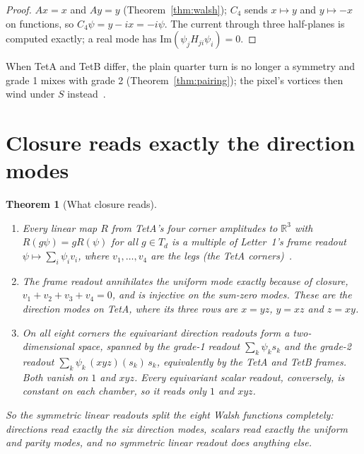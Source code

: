 \documentclass[twocolumn]{iopjournal}
\newtheorem{theorem}{Theorem}
\theoremstyle{definition}
\theoremstyle{remark}
\begin{document}
\begin{proof}
$Ax = x$ and $Ay = y$ (Theorem~\ref{thm:walsh}); $C_4$ sends $x \mapsto y$
and $y \mapsto -x$ on functions, so $C_4\psi = y - ix = -i\psi$. The
current through three half-planes is computed exactly; a real mode has
$\mathrm{Im}(\psi_jH_{ji}\psi_i) = 0$.
\end{proof}

When TetA and TetB differ, the plain quarter turn is no longer a
symmetry and grade 1 mixes with grade 2 (Theorem~\ref{thm:pairing}); the
pixel's vortices then wind under $S$ instead~\cite{NelsonVortex}.


\section{Closure reads exactly the direction modes}

\begin{theorem}[What closure reads]
\label{thm:closure}
\begin{enumerate}
\item[(i)] Every linear map $R$ from TetA's four corner amplitudes to
  $\mathbb R^3$ with $R(g\psi) = gR(\psi)$ for all $g \in T_d$ is a
  multiple of Letter~1's frame readout $\psi \mapsto \sum_i \psi_iv_i$,
  where $v_1, \dots, v_4$ are the legs (the TetA corners)~\cite{NelsonL1}.
\item[(ii)] The frame readout annihilates the uniform mode exactly
  because of closure, $v_1 + v_2 + v_3 + v_4 = 0$, and is injective on
  the sum-zero modes. These are the direction modes on TetA, where its
  three rows are $x = yz$, $y = xz$ and $z = xy$.
\item[(iii)] On all eight corners the equivariant direction readouts form
  a two-dimensional space, spanned by the grade-1 readout
  $\sum_k\psi_k s_k$ and the grade-2 readout $\sum_k\psi_k\,(xyz)(s_k)\,
  s_k$, equivalently by the TetA and TetB frames. Both vanish on $1$ and
  $xyz$. Every equivariant scalar readout, conversely, is constant on each
  chamber, so it reads only $1$ and $xyz$.
\end{enumerate}
So the symmetric linear readouts split the eight Walsh functions
completely: directions read exactly the six direction modes, scalars read
exactly the uniform and parity modes, and no symmetric linear readout
does anything else.
\end{theorem}
\end{document}
